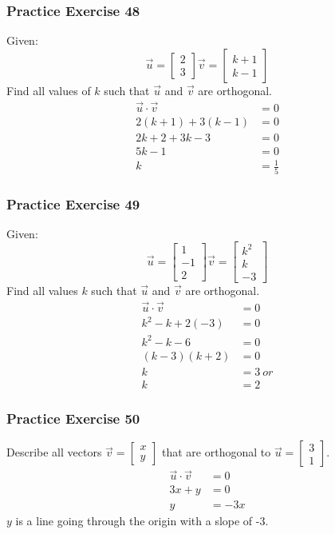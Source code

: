 \documentclass{math}
\begin{document}
\subsubsection*{Practice Exercise 48}
Given:
\[ \vec{u} = \begin{bmatrix}2 \\ 3\end{bmatrix}
  \vec{v} = \begin{bmatrix}k+1 \\ k-1\end{bmatrix} \]
Find all values of \( k \) such that \( \vec{u} \) and \( \vec{v} \) are
orthogonal.
\begin{align*}
  \vec{u}\cdot\vec{v} &= 0 \\
  2(k+1)+3(k-1) &= 0 \\
  2k+2+3k-3 &= 0 \\
  5k-1 &= 0 \\
  k &= \frac{1}{5}
\end{align*}

\subsubsection*{Practice Exercise 49}
Given:
\[ \vec{u} = \begin{bmatrix}1 \\ -1 \\ 2\end{bmatrix}
  \vec{v} = \begin{bmatrix}k^2 \\ k \\ -3\end{bmatrix} \]
Find all values \( k \) such that \( \vec{u} \) and \( \vec{v} \) are
orthogonal.
\begin{align*}
  \vec{u}\cdot\vec{v} &= 0 \\
  k^2-k+2(-3) &= 0 \\
  k^2-k-6 &= 0 \\
  (k-3)(k+2) &= 0 \\
  k &= 3\ or \\
  k &= 2
\end{align*}

\subsubsection*{Practice Exercise 50}
Describe all vectors \( \vec{v} = \begin{bmatrix}x \\ y\end{bmatrix} \) that
are orthogonal to \( \vec{u} = \begin{bmatrix}3 \\ 1\end{bmatrix} \).
\begin{align*}
  \vec{u}\cdot\vec{v} &= 0 \\
  3x+y &= 0 \\
  y &= -3x
\end{align*}
\( y \) is a line going through the origin with a slope of -3.
\end{document}
